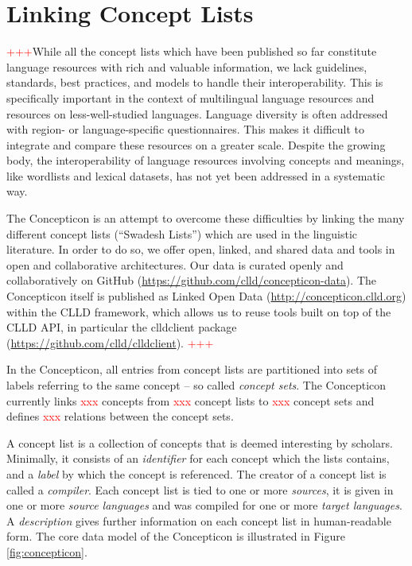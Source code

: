 \documentclass[10pt, a4paper]{article}
\newcommand{\conceptnumber}{\textcolor{red}{xxx} }
\newcommand{\listnumber}{\textcolor{red}{xxx} }
\newcommand{\setnumber}{\textcolor{red}{xxx} }
\newcommand{\relationnumber}{\textcolor{red}{xxx} }
\begin{document}
\section{Linking Concept Lists}
\textcolor{red}{+++}While all the concept lists which have been published so far constitute language
resources with rich and valuable information, we lack guidelines, standards, best practices, and
models to handle their interoperability. This is specifically important in the context of
multilingual language resources and resources on less-well-studied languages. 
Language diversity is often addressed with region- or
language-specific questionnaires. This makes it difficult to integrate and compare these resources
on a greater scale. Despite the growing body, the interoperability of language resources involving
concepts and meanings, like wordlists and lexical datasets, has not yet been addressed in a
systematic way.  
 
The Concepticon is an attempt to overcome these difficulties by linking 
the many different concept lists (``Swadesh Lists'') which are
used in the linguistic literature. 
In order to do so, we offer open, linked, and shared data and tools in open and collaborative
architectures. Our data is curated openly and collaboratively on GitHub (\url{https://github.com/clld/concepticon-data}). The
Concepticon itself is published as Linked Open Data (\url{http://concepticon.clld.org}) within the
CLLD framework, which allows us to reuse tools built on top of the CLLD API, in particular the
clldclient package (\url{https://github.com/clld/clldclient}). \textcolor{red}{+++}


In the Concepticon, all entries from concept lists are partitioned into sets
of labels referring to the same concept -- so called \emph{concept sets}. The Concepticon currently links
\conceptnumber concepts from \listnumber concept lists to \setnumber concept sets and defines
\relationnumber relations between the concept sets.
 
A concept list is a collection of concepts that is deemed interesting by scholars. Minimally, it
consists of an \emph{identifier} for each concept which the lists contains, and a \emph{label} by
which the concept is referenced. The creator of a concept list is called a \emph{compiler}. Each
concept list is tied to one or more \emph{sources}, it is given in one or more \emph{source
languages} and was compiled for one or more \emph{target languages}. A \emph{description} gives
further information on each concept list in human-readable form. The core
data model of the Concepticon is illustrated in Figure \ref{fig:concepticon}.
 
\end{document}

